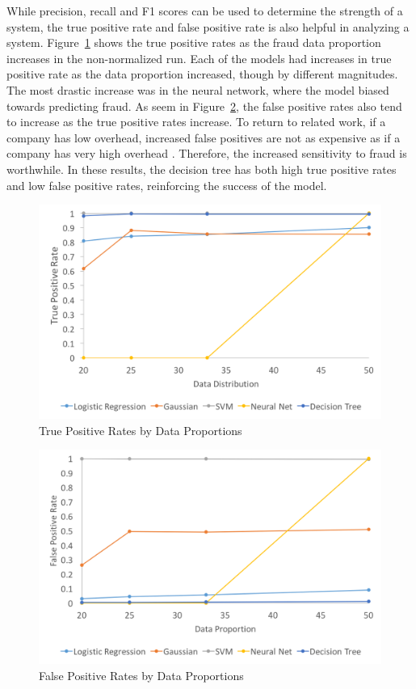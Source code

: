 \documentclass[midd]{thesis}
\begin{document}
While precision, recall and F1 scores can be used to determine the strength of a system, the true positive rate and false positive rate is also helpful in analyzing a system. Figure~\ref{fig:tpr} shows the true positive rates as the fraud data proportion increases in the non-normalized run. Each of the models had increases in true positive rate as the data proportion increased, though by different magnitudes. The most drastic increase was in the neural network, where the model biased towards predicting fraud. As seem in Figure~\ref{fig:fpr}, the false positive rates also tend to increase as the true positive rates increase. To return to related work, if a company has low overhead, increased false positives are not as expensive as if a company has very high overhead \cite{Chan}. Therefore, the increased sensitivity to fraud is worthwhile. In these results, the decision tree has both high true positive rates and low false positive rates, reinforcing the success of the model.   

\begin{figure} \centering
  \includegraphics[scale=.6]{tpr.png}
  \caption{True Positive Rates by Data Proportions}
  \label{fig:tpr}
\end{figure}

\begin{figure} \centering
  \includegraphics[scale=.6]{fpr.png}
  \caption{False Positive Rates by Data Proportions}
  \label{fig:fpr}
\end{figure}
\end{document}
